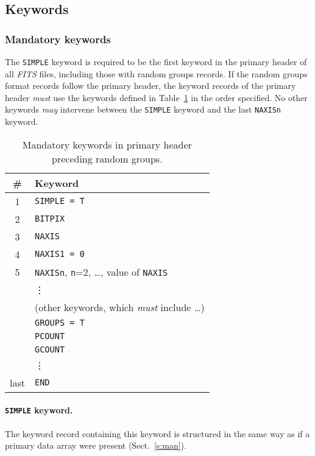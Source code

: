\documentclass[onecolumn]{aa}
\begin{document}
\subsection{Keywords}
 \label{s:rangr} 
 \subsubsection{Mandatory keywords}
   The {\tt SIMPLE} keyword is
   required to be the first keyword in the primary
   header of all {\em FITS\/} files, including those with random
   groups records.  If the random groups format
   records follow the primary header, the keyword
   records of the primary header {\em must} use the keywords 
   defined in Table~\ref{t:hdrrg} in the 
   order
   specified.   No other keywords {\em may} intervene between
   the {\tt SIMPLE} keyword and the last {\tt NAXISn} keyword.


\begin{table}
\centering
\caption{Mandatory keywords in primary header
 preceding random groups.}
\label{t:hdrrg}
\begin{tabular}{cl} 
\hline \hline
\# & Keyword  \\
\hline
     1     & {\tt SIMPLE = T}  \\
     2     & {\tt BITPIX}  \\
     3     & {\tt NAXIS}  \\
     4     & {\tt NAXIS1 = 0}  \\
     5     & {\tt NAXISn}, {\tt n}=2, \ldots, value of {\tt NAXIS}  \\ 
           &  \vdots \\                       
           &  (other keywords, which {\em must} include \ldots) \\  
           &  {\tt GROUPS = T}  \\
           &  {\tt PCOUNT}  \\
           &  {\tt GCOUNT}  \\
           &  \vdots  \\                         
     last  &  {\tt END} \\
\hline
\end{tabular}
\end{table}


   \paragraph{{\tt SIMPLE} keyword.}
   The keyword record containing this keyword is structured in 
   the same way as if a 
   primary data array 
   were present (Sect.\ \ref{s:man}).
  
\end{document}
